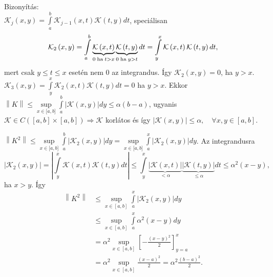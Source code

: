 \documentclass[12pt,a4paper]{scrartcl}
\newenvironment{bizonyitas}{}{}
\begin{document}
\begin{bizonyitas}

Bizonyítás:\\
\(\mathcal{K}_{j}\left( {x,y} \right) = {\int\limits_{a}^{b}{\mathcal{K}_{j - 1}\left( {x,t} \right)\mathcal{K}\left( {t,y} \right)dt}}\),
speciálisan
\[{\mathcal{K}_2}\left( {x,y} \right) = \int\limits_a^b {\underbrace {\mathcal{K}\left( {x,t} \right)}_{0{\text{\;ha\;}}t > x}\underbrace {\mathcal{K}\left( {t,y} \right)}_{0{\text{\;ha\;}}y > t}dt}  = \int\limits_y^x {\mathcal{K}\left( {x,t} \right)\mathcal{K}\left( {t,y} \right)dt},\]
mert csak \(y \leq t \leq x\) esetén nem 0 az integrandus. Így
\(\mathcal{K}_{2}\left( {x,y} \right) = 0\), ha \(y > x\).
\(\mathcal{K}_{3}\left( {x,y} \right) = {\int\limits_{y}^{x}{\mathcal{K}_{2}\left( {x,t} \right)\mathcal{K}\left( {t,y} \right)dt}} = 0\)
ha \(y > x\). Ekkor
\(\left\| K \right\| \leq \sup\limits_{x \in {\lbrack{a,b}\rbrack}}{\int\limits_{a}^{b}{\left| {\mathcal{K}\left( {x,y} \right)} \right|dy}} \leq \alpha\left( {b - a} \right)\),
ugyanis
\(\left. \mathcal{K} \in C\left( {\left\lbrack {a,b} \right\rbrack \times \left\lbrack {a,b} \right\rbrack} \right)\Rightarrow\mathcal{K} \right.\)
korlátos és így
\(\left| {\mathcal{K}\left( {x,y} \right)} \right| \leq \alpha,\quad\forall x,y \in \left\lbrack {a,b} \right\rbrack\).

\end{bizonyitas}

\(\left\| K^{2} \right\| \leq \sup\limits_{x \in {\lbrack{a,b}\rbrack}}{\int\limits_{a}^{b}{\left| {\mathcal{K}_{2}\left( {x,y} \right)} \right|dy}} = \sup\limits_{x \in {\lbrack{a,b}\rbrack}}{\int\limits_{a}^{x}{\left| {\mathcal{K}_{2}\left( {x,y} \right)} \right|dy}}\).
Az integrandusra
\[\left| {{\mathcal{K}_2}\left( {x,y} \right)} \right| = \left| {\int\limits_y^x {\mathcal{K}\left( {x,t} \right)\mathcal{K}\left( {t,y} \right)dt} } \right| \leqslant \int\limits_y^x {\underbrace {\left| {\mathcal{K}\left( {x,t} \right)} \right|}_{ < \alpha }\underbrace {\left| {\mathcal{K}\left( {t,y} \right)} \right|}_{ \leqslant \alpha }dt}  \leqslant {\alpha ^2}\left( {x - y} \right),\]
ha \(x > y\). Így \[\begin{aligned}
  \left\| {{K^2}} \right\| &  \leqslant \mathop {\sup }\limits_{x \in \left[ {a,b} \right]} \int\limits_a^x {\left| {{\mathcal{K}_2}\left( {x,y} \right)} \right|dy}  \\ 
   &  \leqslant \mathop {\sup }\limits_{x \in \left[ {a,b} \right]} \int\limits_a^x {{\alpha ^2}\left( {x - y} \right)dy}  \\ 
   &  = {\alpha ^2}\mathop {\sup }\limits_{x \in \left[ {a,b} \right]} \left[ { - \frac{{{{\left( {x - y} \right)}^2}}}{2}} \right]_{y = a}^x \\ 
   &  = {\alpha ^2}\mathop {\sup }\limits_{x \in \left[ {a,b} \right]} \frac{{{{\left( {x - a} \right)}^2}}}{2} = {\alpha ^2}\frac{{{{\left( {b - a} \right)}^2}}}{2}. \\ 
\end{aligned} \]
\end{document}
